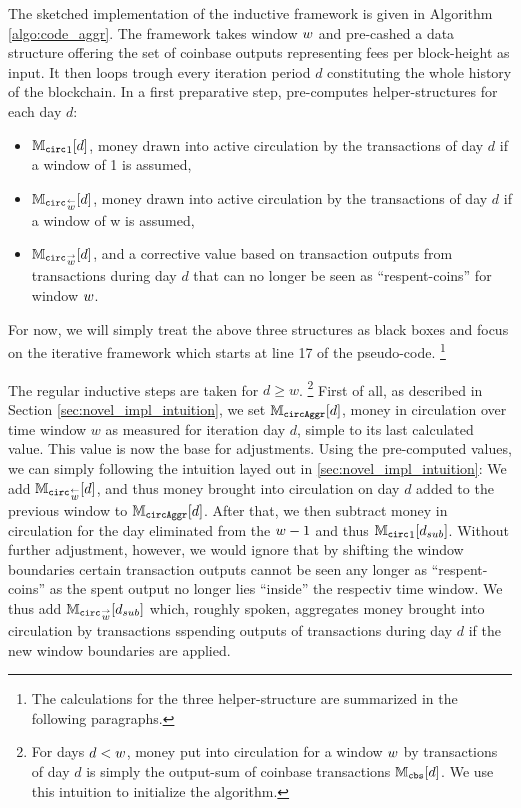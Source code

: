 The sketched implementation of the inductive framework is given in Algorithm \ref{algo:code_aggr}. %
The framework takes window \({w}\) and pre-cashed a data structure offering the set of coinbase outputs representing fees per block-height as input. %
It then loops trough every iteration period \(d\) constituting the whole history of the blockchain. %
In a first preparative step, pre-computes helper-structures for each day \(d\):
\begin{itemize}
\item \( {\mathbb{M}_{\mathtt{circ}}}_{1}[d] \), money drawn into active circulation by the transactions of day \( d \) if a window of 1 is assumed,
\item \( {{\mathbb{M}_{\mathtt{circ}}}_{\overset{\leftarrow}{{w}}}}[d] \), money drawn into active circulation by the transactions of day \(d\) if a window of w is assumed,
\item \( {{\mathbb{M}_{\mathtt{circ}}}_{\overset{\rightarrow}{{w}}}}[d] \), and a corrective value based on transaction outputs from transactions during day \(d\) that can no longer be seen as ``respent-coins'' for window \({w}\).  
\end{itemize}

For now, we will simply treat the above three structures as black boxes and focus on the iterative framework which starts at line 17 of the pseudo-code.%
\footnote{The calculations for the three helper-structure are summarized in the following paragraphs.} %

The regular inductive steps are taken for \(d \geq w \).%
\footnote{
For days \(d < {w} \), money put into circulation for a window \({w}\) by transactions of day \(d\) is simply the output-sum of coinbase transactions \({\mathbb{M}_{{\mathtt{cbs}}}}[d]\). %
We use this intuition to initialize the algorithm.} %
First of all, as described in Section \ref{sec:novel_impl_intuition}, we set \({\mathbb{M}_{\mathtt{circAggr}}}[d]\), money in circulation over time window \(w\) as measured for iteration day \(d\), simple to its last calculated value. %
This value is now the base for adjustments. %
Using the pre-computed values, we can simply following the intuition layed out in \ref{sec:novel_impl_intuition}: %
We add \({{\mathbb{M}_{\mathtt{circ}}}_{\overset{\leftarrow}{{w}}}}[d]\), and thus money brought into circulation on day \(d\) added to the previous window to \({\mathbb{M}_{\mathtt{circAggr}}}[d]\). %
After that, we then subtract money in circulation for the day eliminated from the \({w} - 1\) and thus \({\mathbb{M}_{\mathtt{circ}}}_{1}[d_{sub}]\). %
Without further adjustment, however, we would ignore that by shifting the window boundaries certain transaction outputs cannot be seen any longer as ``respent-coins'' as the spent output no longer lies ``inside'' the respectiv time window. %
We thus add \( {{\mathbb{M}_{\mathtt{circ}}}_{\overset{\rightarrow}{{w}}}}[d_{sub}] \) which, roughly spoken, aggregates money brought into circulation by transactions sspending outputs of transactions during day \(d\) if the new window boundaries are applied. %

